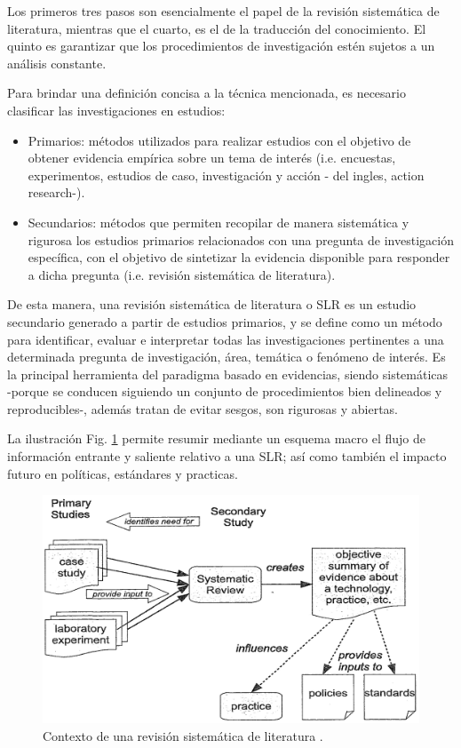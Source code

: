 Los primeros tres pasos son esencialmente el papel de la revisión sistemática de literatura, mientras que el cuarto, es el de la traducción del conocimiento. El quinto es garantizar que los procedimientos de investigación estén sujetos a un análisis constante.

Para brindar una definición concisa a la técnica mencionada, es necesario clasificar las investigaciones en estudios:

\begin{itemize}
    \item Primarios: métodos utilizados para realizar estudios con el objetivo de obtener evidencia empírica sobre un tema de interés (i.e. encuestas, experimentos, estudios de caso, investigación y acción - del ingles, action research-).
    \item Secundarios: métodos que permiten recopilar de manera sistemática y rigurosa los estudios primarios relacionados con una pregunta de investigación específica, con el objetivo de sintetizar la evidencia disponible para responder a dicha pregunta (i.e.  revisión sistemática de literatura).
\end{itemize}

De esta manera, una revisión sistemática de literatura o SLR es un estudio secundario generado a partir de estudios primarios, y se define como un método para identificar, evaluar e interpretar todas las investigaciones pertinentes a una determinada pregunta de investigación, área, temática o fenómeno de interés. Es la principal herramienta del paradigma basado en evidencias, siendo sistemáticas -porque se conducen siguiendo un conjunto de procedimientos bien delineados y reproducibles-, además tratan de evitar sesgos, son rigurosas y abiertas.

La ilustración Fig. \ref{fig:context_srl} permite resumir mediante un esquema macro el flujo de información entrante y saliente relativo a una SLR; así como también el impacto futuro en políticas, estándares y practicas. 

\begin{figure}[H]
\includegraphics[width=\textwidth]{TESIS/imagenes/chap02/Contexto_RSL.PNG}
\caption{ Contexto de una revisión sistemática de literatura \cite{Kitchenham2006}.}
\label{fig:context_srl}
\end{figure}

